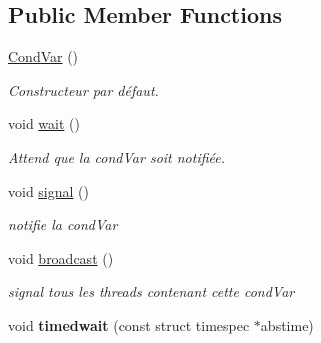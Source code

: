 \subsection*{Public Member Functions}
\begin{DoxyCompactItemize}
\item 
\hypertarget{classmognetwork_1_1_cond_var_ab7f3756ed998d61f8c4eec3d1f3a984b}{\hyperlink{classmognetwork_1_1_cond_var_ab7f3756ed998d61f8c4eec3d1f3a984b}{Cond\-Var} ()}\label{classmognetwork_1_1_cond_var_ab7f3756ed998d61f8c4eec3d1f3a984b}

\begin{DoxyCompactList}\small\item\em Constructeur par défaut. \end{DoxyCompactList}\item 
\hypertarget{classmognetwork_1_1_cond_var_afaee9fd061be682985bdc15d45e11816}{void \hyperlink{classmognetwork_1_1_cond_var_afaee9fd061be682985bdc15d45e11816}{wait} ()}\label{classmognetwork_1_1_cond_var_afaee9fd061be682985bdc15d45e11816}

\begin{DoxyCompactList}\small\item\em Attend que la cond\-Var soit notifiée. \end{DoxyCompactList}\item 
\hypertarget{classmognetwork_1_1_cond_var_aeb5e8e751376a09f36c115e342778d3f}{void \hyperlink{classmognetwork_1_1_cond_var_aeb5e8e751376a09f36c115e342778d3f}{signal} ()}\label{classmognetwork_1_1_cond_var_aeb5e8e751376a09f36c115e342778d3f}

\begin{DoxyCompactList}\small\item\em notifie la cond\-Var \end{DoxyCompactList}\item 
\hypertarget{classmognetwork_1_1_cond_var_ae407b095e176f8c360d1f03ceaac1ad7}{void \hyperlink{classmognetwork_1_1_cond_var_ae407b095e176f8c360d1f03ceaac1ad7}{broadcast} ()}\label{classmognetwork_1_1_cond_var_ae407b095e176f8c360d1f03ceaac1ad7}

\begin{DoxyCompactList}\small\item\em signal tous les threads contenant cette cond\-Var \end{DoxyCompactList}\item 
\hypertarget{classmognetwork_1_1_cond_var_a75efe016cf3ea093555f302bd980ad34}{void {\bfseries timedwait} (const struct timespec $\ast$abstime)}\label{classmognetwork_1_1_cond_var_a75efe016cf3ea093555f302bd980ad34}

\end{DoxyCompactItemize}
